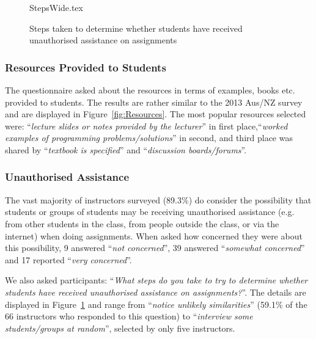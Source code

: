\documentclass[english,submission]{programming}
\begin{document}
\begin{figure}
\begin{center}
{StepsWide.tex}
\end{center}
\caption{Steps taken to determine whether students have received unauthorised assistance on assignments\label{fig:Plagiarise}}
\end{figure}

\subsubsection{Resources Provided to Students}

The questionnaire asked about the resources in terms of examples,
books etc. provided to students. The results are rather similar to the
2013 Aus/NZ survey~\cite[Figure 14]{mason+cooper:2014} and are
displayed in Figure~\ref{fig:Resources}. The most popular resources
selected were: ``{\emph{lecture slides or notes provided by the
lecturer}}'' in first place,``{\emph{worked examples of programming
problems/solutions}}'' in second, and third place was shared by
``{\emph{textbook is specified}}'' and ``{\emph{discussion
boards/forums}}''.

\subsubsection{Unauthorised Assistance}

The vast majority of instructors surveyed (89.3\%) do consider the
possibility that students or groups of students may be receiving
unauthorised assistance (e.g. from other students in the class, from
people outside the class, or via the internet) when doing
assignments. When asked how concerned they were about this
possibility, 9 answered ``{\emph{not concerned}}'', 39 answered
``{\emph{somewhat concerned}}'' and 17 reported ``{\emph{very
concerned}}''.

We also asked participants: ``{\emph{What steps do you take to try to
determine whether students have received unauthorised assistance on
assignments?}}''. The details are displayed in
Figure~\ref{fig:Plagiarise} and range from ``{\emph{notice unlikely
similarities}}'' (59.1\% of the 66 instructors who responded to this
question) to ``{\emph{interview some students/groups at random}}'',
selected by only five instructors.

\end{document}
